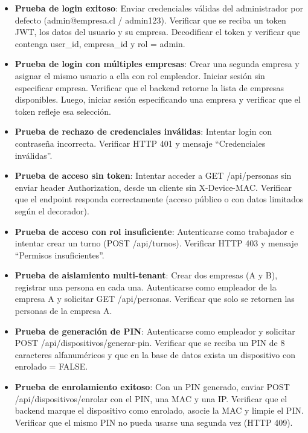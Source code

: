 \begin{itemize}
    \item \textbf{Prueba de login exitoso}: Enviar credenciales válidas del administrador por defecto (admin@empresa.cl / admin123). Verificar que se reciba un token JWT, los datos del usuario y su empresa. Decodificar el token y verificar que contenga user\_id, empresa\_id y rol = admin.

    \item \textbf{Prueba de login con múltiples empresas}: Crear una segunda empresa y asignar el mismo usuario a ella con rol empleador. Iniciar sesión sin especificar empresa. Verificar que el backend retorne la lista de empresas disponibles. Luego, iniciar sesión especificando una empresa y verificar que el token refleje esa selección.

    \item \textbf{Prueba de rechazo de credenciales inválidas}: Intentar login con contraseña incorrecta. Verificar HTTP 401 y mensaje ``Credenciales inválidas''.

    \item \textbf{Prueba de acceso sin token}: Intentar acceder a GET /api/personas sin enviar header Authorization, desde un cliente sin X-Device-MAC. Verificar que el endpoint responda correctamente (acceso público o con datos limitados según el decorador).

    \item \textbf{Prueba de acceso con rol insuficiente}: Autenticarse como trabajador e intentar crear un turno (POST /api/turnos). Verificar HTTP 403 y mensaje ``Permisos insuficientes''.

    \item \textbf{Prueba de aislamiento multi-tenant}: Crear dos empresas (A y B), registrar una persona en cada una. Autenticarse como empleador de la empresa A y solicitar GET /api/personas. Verificar que solo se retornen las personas de la empresa A.

    \item \textbf{Prueba de generación de PIN}: Autenticarse como empleador y solicitar POST /api/dispositivos/generar-pin. Verificar que se reciba un PIN de 8 caracteres alfanuméricos y que en la base de datos exista un dispositivo con enrolado = FALSE.

    \item \textbf{Prueba de enrolamiento exitoso}: Con un PIN generado, enviar POST /api/dispositivos/enrolar con el PIN, una MAC y una IP. Verificar que el backend marque el dispositivo como enrolado, asocie la MAC y limpie el PIN. Verificar que el mismo PIN no pueda usarse una segunda vez (HTTP 409).


\end{itemize}
